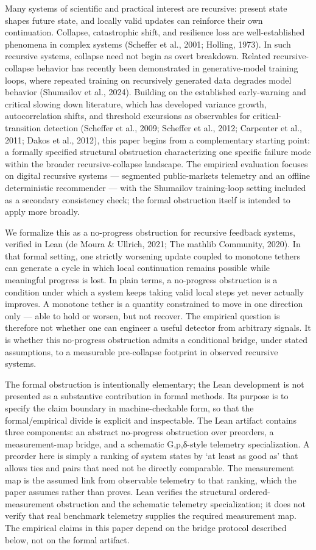 \documentclass[
  11pt,
]{article}
\begin{document}
Many systems of scientific and practical interest are recursive: present
state shapes future state, and locally valid updates can reinforce their
own continuation. Collapse, catastrophic shift, and resilience loss are
well-established phenomena in complex systems (Scheffer et al., 2001;
Holling, 1973). In such recursive systems, collapse need not begin as
overt breakdown. Related recursive-collapse behavior has recently been
demonstrated in generative-model training loops, where repeated training
on recursively generated data degrades model behavior (Shumailov et al.,
2024). Building on the established early-warning and critical slowing
down literature, which has developed variance growth, autocorrelation
shifts, and threshold excursions as observables for critical-transition
detection (Scheffer et al., 2009; Scheffer et al., 2012; Carpenter et
al., 2011; Dakos et al., 2012), this paper begins from a complementary
starting point: a formally specified structural obstruction
characterizing one specific failure mode within the broader
recursive-collapse landscape. The empirical evaluation focuses on
digital recursive systems --- segmented public-markets telemetry and an
offline deterministic recommender --- with the Shumailov training-loop
setting included as a secondary consistency check; the formal
obstruction itself is intended to apply more broadly.

We formalize this as a no-progress obstruction for recursive feedback
systems, verified in Lean (de Moura \& Ullrich, 2021; The mathlib
Community, 2020). In that formal setting, one strictly worsening update
coupled to monotone tethers can generate a cycle in which local
continuation remains possible while meaningful progress is lost. In
plain terms, a no-progress obstruction is a condition under which a
system keeps taking valid local steps yet never actually improves. A
monotone tether is a quantity constrained to move in one direction only
--- able to hold or worsen, but not recover. The empirical question is
therefore not whether one can engineer a useful detector from arbitrary
signals. It is whether this no-progress obstruction admits a conditional
bridge, under stated assumptions, to a measurable pre-collapse footprint
in observed recursive systems.

The formal obstruction is intentionally elementary; the Lean development
is not presented as a substantive contribution in formal methods. Its
purpose is to specify the claim boundary in machine-checkable form, so
that the formal/empirical divide is explicit and inspectable. The Lean
artifact contains three components: an abstract no-progress obstruction
over preorders, a measurement-map bridge, and a schematic G,p,δ-style
telemetry specialization. A preorder here is simply a ranking of system
states by `at least as good as' that allows ties and pairs that need not
be directly comparable. The measurement map is the assumed link from
observable telemetry to that ranking, which the paper assumes rather
than proves. Lean verifies the structural ordered-measurement
obstruction and the schematic telemetry specialization; it does not
verify that real benchmark telemetry supplies the required measurement
map. The empirical claims in this paper depend on the bridge protocol
described below, not on the formal artifact.
\end{document}
